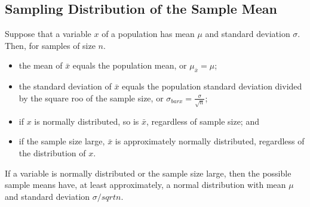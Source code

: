\documentclass[12pt]{article}
\begin{document}
        \subsection*{Sampling Distribution of the Sample Mean}
            Suppose that a variable $x$ of a population has mean $\mu$ and standard deviation
            $\sigma$. Then, for samples of size $n$.
            \begin{itemize}
                \item the mean of $\bar{x}$ equals the population mean, or $\mu_{\bar{x}} = \mu$;                
                \item the standard deviation of $\bar{x}$ equals the population standard
                deviation divided by the square roo of the sample size, or $\sigma_{bar{x}} =
                \frac{\sigma}{\sqrt{n}}$;
                \item if $x$ is normally distributed, so is $\bar{x}$, regardless of sample size;
                and
                \item if the sample size large, $\bar{x}$ is approximately normally distributed,
                regardless of the distribution of $x$.
            \end{itemize}
            If a variable is normally distributed or the sample size large, then the possible 
            sample means have, at least approximately, a normal distribution with mean $\mu$
            and standard deviation $\sigma / sqrt{n}$.  
\end{document}
